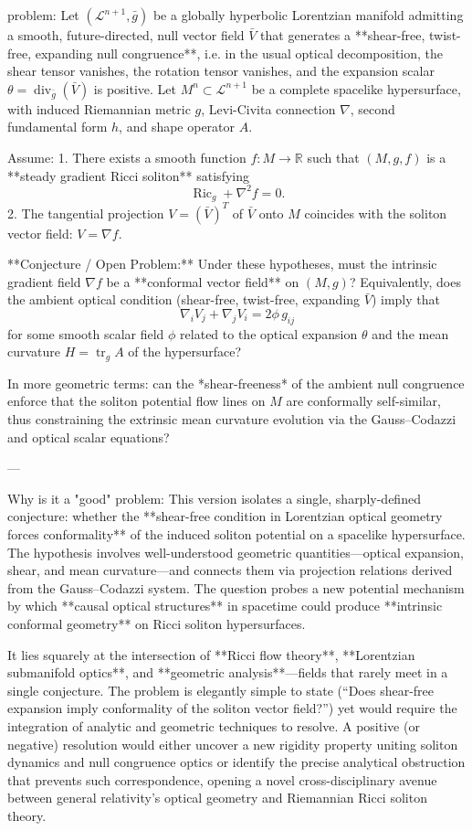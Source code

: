 problem:  
Let \((\mathcal{L}^{n+1}, \bar{g})\) be a globally hyperbolic Lorentzian manifold admitting a smooth, future-directed, null vector field \(\bar{V}\) that generates a **shear-free, twist-free, expanding null congruence**, i.e. in the usual optical decomposition, the shear tensor vanishes, the rotation tensor vanishes, and the expansion scalar \(\theta = \operatorname{div}_{\bar{g}}(\bar{V})\) is positive.  
Let \(M^n \subset \mathcal{L}^{n+1}\) be a complete spacelike hypersurface, with induced Riemannian metric \(g\), Levi-Civita connection \(\nabla\), second fundamental form \(h\), and shape operator \(A\).  

Assume:
1. There exists a smooth function \(f : M \to \mathbb{R}\) such that \((M,g,f)\) is a **steady gradient Ricci soliton** satisfying  
   \[
   \operatorname{Ric}_g + \nabla^2 f = 0.
   \]
2. The tangential projection \(V = (\bar{V})^T\) of \(\bar{V}\) onto \(M\) coincides with the soliton vector field: \(V = \nabla f\).  

**Conjecture / Open Problem:**  
Under these hypotheses, must the intrinsic gradient field \(\nabla f\) be a **conformal vector field** on \((M,g)\)?  
Equivalently, does the ambient optical condition (shear-free, twist-free, expanding \(\bar{V}\)) imply that
\[
\nabla_i V_j + \nabla_j V_i = 2\phi\, g_{ij}
\]
for some smooth scalar field \(\phi\) related to the optical expansion \(\theta\) and the mean curvature \(H = \operatorname{tr}_g A\) of the hypersurface?

In more geometric terms: can the *shear-freeness* of the ambient null congruence enforce that the soliton potential flow lines on \(M\) are conformally self-similar, thus constraining the extrinsic mean curvature evolution via the Gauss–Codazzi and optical scalar equations?  

---

Why is it a "good" problem:  
This version isolates a single, sharply-defined conjecture: whether the **shear-free condition in Lorentzian optical geometry forces conformality** of the induced soliton potential on a spacelike hypersurface. The hypothesis involves well-understood geometric quantities—optical expansion, shear, and mean curvature—and connects them via projection relations derived from the Gauss–Codazzi system. The question probes a new potential mechanism by which **causal optical structures** in spacetime could produce **intrinsic conformal geometry** on Ricci soliton hypersurfaces.  

It lies squarely at the intersection of **Ricci flow theory**, **Lorentzian submanifold optics**, and **geometric analysis**—fields that rarely meet in a single conjecture. The problem is elegantly simple to state (“Does shear-free expansion imply conformality of the soliton vector field?”) yet would require the integration of analytic and geometric techniques to resolve. A positive (or negative) resolution would either uncover a new rigidity property uniting soliton dynamics and null congruence optics or identify the precise analytical obstruction that prevents such correspondence, opening a novel cross-disciplinary avenue between general relativity’s optical geometry and Riemannian Ricci soliton theory.